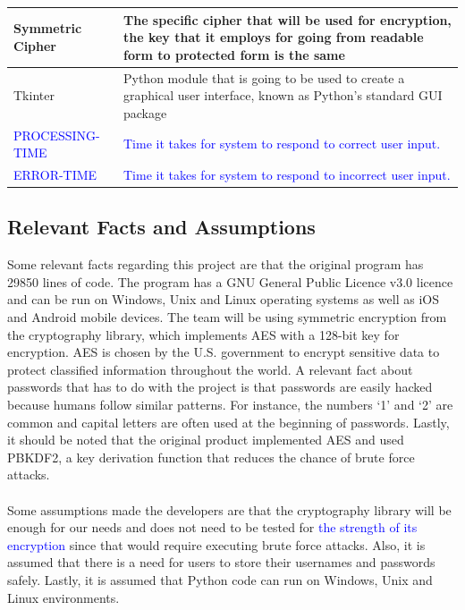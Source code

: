 \documentclass[12pt, titlepage]{article}
\begin{document}
\begin{table}[H]
\begin{tabular}{ | p{3cm} | p{10.5cm} | }
	\hline
	Symmetric Cipher & The specific cipher that will be used for encryption, the key that it employs for going from readable form to protected form is the same \\
	\hline
	Tkinter & Python module that is going to be used to create a graphical user interface, known as Python’s standard GUI package \\
	\hline
	\textcolor{blue}{PROCESSING-TIME} & \textcolor{blue}{Time it takes for system to respond to correct user input.} \\
	\hline
	\textcolor{blue}{ERROR-TIME} & \textcolor{blue}{Time it takes for system to respond to incorrect user input.} \\
\hline
\end{tabular}
\end{table}

\subsection{Relevant Facts and Assumptions}

Some relevant facts regarding this project are that the original program has 29850 lines of code. 
The program has a GNU General Public Licence v3.0 licence and can be run on Windows, Unix and Linux 
operating systems as well as iOS and Android mobile devices. The team will be using symmetric encryption
 from the cryptography library, which implements AES with a 128-bit key for encryption. AES is chosen by the 
U.S. government to encrypt sensitive data to protect classified information throughout the world. A relevant 
fact about passwords that has to do with the project is that passwords are easily hacked because humans 
follow similar patterns. For instance, the numbers ‘1’ and ‘2’ are common and capital letters are often used at
 the beginning of passwords. Lastly, it should be noted that the original product implemented AES and used 
PBKDF2, a key derivation function that reduces the chance of brute force attacks.
\\
\\
Some assumptions made the developers are that the cryptography library will be enough for our needs and does
 not need to be tested for \textcolor{blue}{the strength of its encryption} since that would require executing brute force attacks. Also, it is 
assumed that there is a need for users to store their usernames and passwords safely. Lastly, it is assumed 
that Python code can run on Windows, Unix and Linux environments. 
\end{document}
